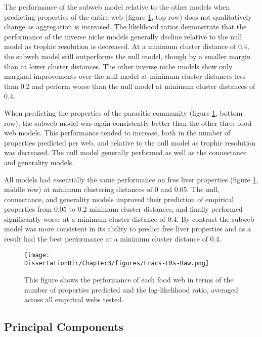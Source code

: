 \documentclass[/home/nkappler/Research/Dissertation/
 dissertation.tex]{subfiles}
\begin{document}
\begin{bibunit}
The performance of the subweb model relative to the other models when
predicting properties of the entire web (figure \ref{fig:ErrorsAggRaw},
top row) does not qualitatively change as aggregation is increased. The
likelihood ratios demonstrate that the performance of the inverse niche models
generally decline relative to the null model as trophic resolution is
decreased. At a minimum cluster distance of 0.4, the subweb model still
outperforms the null model, though by a smaller margin than at lower cluster
distances. The other inverse niche models show only marginal improvements over
the null model at minimum cluster distances less than 0.2 and perform worse
than the null model at minimum cluster distances of 0.4.

When predicting the properties of the parasitic community (figure
\ref{fig:ErrorsAggRaw}, bottom row), the subweb model was again consistently
better than the other three food web models. This performance tended to
increase, both in the number of properties predicted per web, and relative to
the null model as trophic resolution was decreased. The null model generally
performed as well as the connectance and generality models.

All models had essentially the same performance on free liver properties
(figure \ref{fig:ErrorsAggRaw}, middle row) at minimum clustering distances of
0 and 0.05. The null, connectance, and generality models improved their
prediction of empirical properties from 0.05 to 0.2 minimum cluster distances,
and finally performed significantly worse at a minimum cluster distance of 0.4.
By contrast the subweb model was more consistent in its ability to predict free
liver properties and as a result had the best performance at a minimum cluster
distance of 0.4. 

 \begin{figure}
     \centering
     \texttt{[image: \\DissertationDir/Chapter3/figures/Fracs-LRs-Raw.png]}
     \caption[Performance of niche models on agglomerated webs raw properties]{This figure shows the performance of each food web in terms of
         the number of properties predicted and the log-likelihood ratio,
         averaged across all empirical webs tested.
 \label{fig:ErrorsAggRaw}}
 \end{figure}

\subsection{Principal Components}


\end{bibunit}
\end{document}

